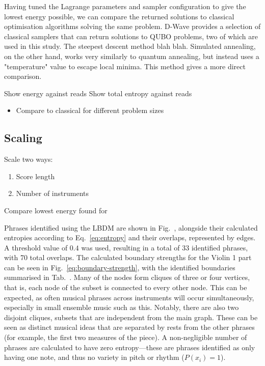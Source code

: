 \documentclass[12pt]{article}
\begin{document}
Having tuned the Lagrange parameters and sampler configuration to give the lowest energy possible, we can compare the returned solutions to classical optimisation algorithms solving the same problem. D-Wave provides a selection of classical samplers that can return solutions to QUBO problems, two of which are used in this study. The steepest descent method blah blah. Simulated annealing, on the other hand, works very similarly to quantum annealing, but instead uses a "temperature" value to escape local minima. This method gives a more direct comparison.

Show energy against reads
Show total entropy against reads


\begin{itemize}
    \item Compare to classical for different problem sizes
\end{itemize}

\subsection{Scaling}

Scale two ways:

\begin{enumerate}
    \item Score length
    \item Number of instruments
\end{enumerate}

Compare lowest energy found for 

Phrases identified using the LBDM are shown in Fig.\  , alongside their calculated entropies according to Eq.\ \ref{eq:entropy} and their overlaps, represented by edges. A threshold value of $0.4$ was used, resulting in a total of 33 identified phrases, with 70 total overlaps. The calculated boundary strengths for the Violin 1 part can be seen in Fig.\ \ref{eq:boundary-strength}, with the identified boundaries summarised in Tab.\ . Many of the nodes form cliques of three or four vertices, that is, each node of the subset is connected to every other node. This can be expected, as often musical phrases across instruments will occur simultaneously, especially in small ensemble music such as this. Notably, there are also two disjoint cliques, subsets that are independent from the main graph. These can be seen as distinct musical ideas that are separated by rests from the other phrases (for example, the first two measures of the piece). A non-negligible number of phrases are calculated to have zero entropy—these are phrases identified as only having one note, and thus no variety in pitch or rhythm ($P(x_i)=1$).
\end{document}
